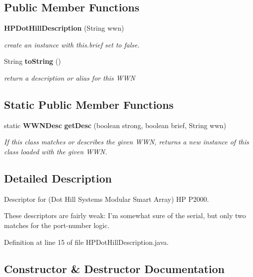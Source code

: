 \subsection*{Public Member Functions}
\begin{DoxyCompactItemize}
\item 
{\bf H\-P\-Dot\-Hill\-Description} (String wwn)
\begin{DoxyCompactList}\small\item\em create an instance with this.\-brief set to false. \end{DoxyCompactList}\item 
String {\bf to\-String} ()
\begin{DoxyCompactList}\small\item\em return a description or alias for this W\-W\-N \end{DoxyCompactList}\end{DoxyCompactItemize}
\subsection*{Static Public Member Functions}
\begin{DoxyCompactItemize}
\item 
static {\bf W\-W\-N\-Desc} {\bf get\-Desc} (boolean strong, boolean brief, String wwn)
\begin{DoxyCompactList}\small\item\em If this class matches or describes the given W\-W\-N, returns a new instance of this class loaded with the given W\-W\-N. \end{DoxyCompactList}\end{DoxyCompactItemize}


\subsection{Detailed Description}
Descriptor for (Dot Hill Systems Modular Smart Array) H\-P P2000. 

These descriptors are fairly weak\-: I'm somewhat sure of the serial, but only two matches for the port-\/number logic. 

Definition at line 15 of file H\-P\-Dot\-Hill\-Description.\-java.



\subsection{Constructor \& Destructor Documentation}
